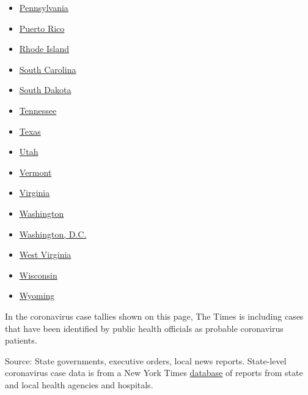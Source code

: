 \begin{itemize}
\item
  \href{https://www.nytimes.com/interactive/2020/us/pennsylvania-coronavirus-cases.html}{Pennsylvania}
\item
  \href{https://www.nytimes.com/interactive/2020/us/puerto-rico-coronavirus-cases.html}{Puerto
  Rico}
\item
  \href{https://www.nytimes.com/interactive/2020/us/rhode-island-coronavirus-cases.html}{Rhode
  Island}
\item
  \href{https://www.nytimes.com/interactive/2020/us/south-carolina-coronavirus-cases.html}{South
  Carolina}
\item
  \href{https://www.nytimes.com/interactive/2020/us/south-dakota-coronavirus-cases.html}{South
  Dakota}
\item
  \href{https://www.nytimes.com/interactive/2020/us/tennessee-coronavirus-cases.html}{Tennessee}
\item
  \href{https://www.nytimes.com/interactive/2020/us/texas-coronavirus-cases.html}{Texas}
\item
  \href{https://www.nytimes.com/interactive/2020/us/utah-coronavirus-cases.html}{Utah}
\item
  \href{https://www.nytimes.com/interactive/2020/us/vermont-coronavirus-cases.html}{Vermont}
\item
  \href{https://www.nytimes.com/interactive/2020/us/virginia-coronavirus-cases.html}{Virginia}
\item
  \href{https://www.nytimes.com/interactive/2020/us/washington-coronavirus-cases.html}{Washington}
\item
  \href{https://www.nytimes.com/interactive/2020/us/washington-dc-coronavirus-cases.html}{Washington,
  D.C.}
\item
  \href{https://www.nytimes.com/interactive/2020/us/west-virginia-coronavirus-cases.html}{West
  Virginia}
\item
  \href{https://www.nytimes.com/interactive/2020/us/wisconsin-coronavirus-cases.html}{Wisconsin}
\item
  \href{https://www.nytimes.com/interactive/2020/us/wyoming-coronavirus-cases.html}{Wyoming}
\end{itemize}

In the coronavirus case tallies shown on this page, The Times is
including cases that have been identified by public health officials as
probable coronavirus patients.

Source: State governments, executive orders, local news reports.
State-level coronavirus case data is from a New York Times
\href{https://www.nytimes.com/interactive/2020/us/coronavirus-us-cases.html}{database}
of reports from state and local health agencies and hospitals.

